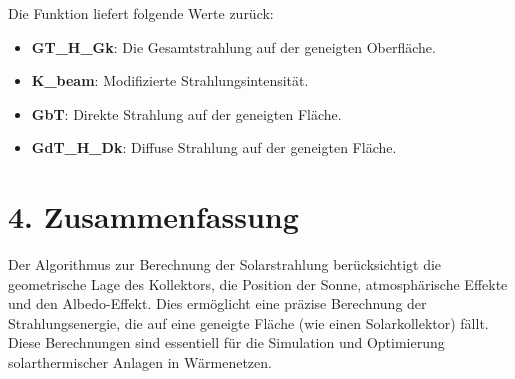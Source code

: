 \documentclass{article}
\begin{document}
Die Funktion liefert folgende Werte zurück:
\begin{itemize}
    \item \textbf{GT\_H\_Gk}: Die Gesamtstrahlung auf der geneigten Oberfläche.
    \item \textbf{K\_beam}: Modifizierte Strahlungsintensität.
    \item \textbf{GbT}: Direkte Strahlung auf der geneigten Fläche.
    \item \textbf{GdT\_H\_Dk}: Diffuse Strahlung auf der geneigten Fläche.
\end{itemize}

\section*{4. Zusammenfassung}

Der Algorithmus zur Berechnung der Solarstrahlung berücksichtigt die geometrische Lage des Kollektors, die Position der Sonne, atmosphärische Effekte und den Albedo-Effekt. Dies ermöglicht eine präzise Berechnung der Strahlungsenergie, die auf eine geneigte Fläche (wie einen Solarkollektor) fällt. Diese Berechnungen sind essentiell für die Simulation und Optimierung solarthermischer Anlagen in Wärmenetzen.
\end{document}
